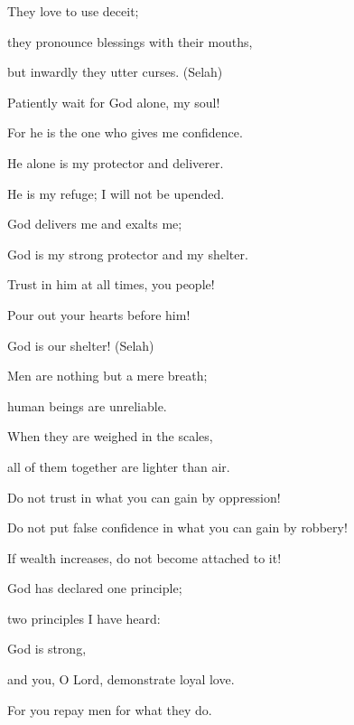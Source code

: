 {\par }{\Q They love to use deceit;

\par }{\Q they pronounce blessings
with their
mouths,
\par }{\Q but inwardly
they utter curses.
(Selah)
\par }{\Q {}Patiently wait
for God
alone, my soul!

\par }{\Q For
he is the one who gives me confidence.
\par }{\Q {}He alone
is my protector
and deliverer.
\par }{\Q He is my refuge;
I will not
be upended.
\par }{\Q {}God
delivers
me and exalts
me;
\par }{\Q God
is my
strong
protector
and my shelter.
\par }{\Q {}Trust
in him at all
times,
you people!
\par }{\Q Pour
out your hearts
before
him!

\par }{\Q God
is our shelter! (Selah)
\par }{\Q {}Men
are nothing but
a mere breath;
\par }{\Q human
beings are unreliable.
\par }{\Q When they are weighed in the scales,
\par }{\Q all of them together
are lighter than air.
\par }{\Q {}Do not
trust
in what you can gain by oppression!

\par }{\Q Do not
put false confidence in what you can gain by robbery!

\par }{\Q If wealth
increases,
do not
become attached to it!
\par }{\Q {}God
has declared
one
principle;
\par }{\Q two
principles I have heard:

\par }{\Q God
is strong,
\par }{\Q {}and you, O Lord,
demonstrate loyal love.
\par }{\Q For
you
repay
men
for what they do.


\par }
